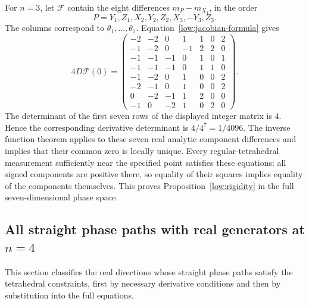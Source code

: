 For $n=3$, let $\mathcal F$ contain the eight differences $m_P-m_{X_1}$,
in the order
\begin{equation*}
 P=Y_1,Z_1,X_2,Y_2,Z_2,X_3,-Y_3,Z_3.
\end{equation*}
The columns correspond to $\theta_1,\ldots,\theta_7$.
Equation~\eqref{low:jacobian-formula} gives
\begin{equation}
 4D\mathcal F(0)=
 \begin{pmatrix}
 -2&-2&0&1&1&0&2\\
 -1&-2&0&-1&2&2&0\\
 -1&-1&-1&0&1&0&1\\
 -1&-1&-1&0&1&1&0\\
 -1&-2&0&1&0&0&2\\
 -2&-1&0&1&0&0&2\\
 0&-2&-1&1&2&0&0\\
 -1&0&-2&1&0&2&0
 \end{pmatrix}.
 \label{low:jacobian-three}
\end{equation}
The determinant of the first seven rows of the displayed integer matrix is
$4$.  Hence the corresponding derivative determinant is
$4/4^7=1/4096$.  The inverse function theorem applies to these seven
real analytic component differences and implies that their common zero is
locally unique.  Every regular-tetrahedral measurement sufficiently near
the specified point satisfies these equations: all signed components are
positive there, so equality of their squares implies equality of the
components themselves.  This proves Proposition~\ref{low:rigidity} in
the full seven-dimensional phase space.

\subsection{All straight phase paths with real generators at \texorpdfstring{$n=4$}{n=4}}
\label{low:app-lines}

This section classifies the real directions whose straight phase paths satisfy the tetrahedral constraints, first by necessary derivative conditions and then by substitution into the full equations.

